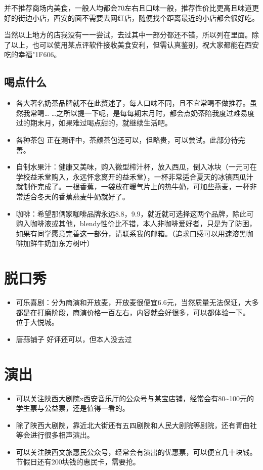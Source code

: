 \documentclass[zihao=-4,fontset=none]{Beautybook-CN}
\begin{document}
并不推荐商场内美食，一般人均都会70左右且口味一般，推荐性价比更高且味道更好的街边小店，西安的面不需要去网红店，随便找个距离最近的小店都会很好吃。

当然以上地方的店我没有一一尝试，去过其中一部分都还不错，所以列在里面。除了以上，也可以使用某点评软件接收美食安利，但需认真鉴别，祝大家都能在西安吃的幸福{\char"1F606}。

\subsection{喝点什么}


\begin{itemize}
\item 各大著名奶茶品牌就不在此赘述了，每人口味不同，且不宜常喝不做推荐。虽然我常喝{\ldots} {\ldots}之所以提一下呢，是每每期末月时，都会点奶茶陪我度过难易度过的期末月，如果难过喝点甜的，就继续生活吧。
\item 各种茶包 正在测评中，茶颜茶包还可以，但略贵，可以尝试。此部分待完善。
\item 自制水果汁：健康又美味，购入微型榨汁杯，放入西瓜，倒入冰块（一元可在学校益禾堂购入，永远怀念离开的益禾堂），一杯非常适合夏天的冰镇西瓜汁就制作完成了。一根香蕉，一袋放在暖气片上的热牛奶，可加些燕麦，一杯非常适合冬天的香蕉燕麦牛奶就好了。
\item 咖啡：希望那俩家咖啡品牌永远8.8，9.9，就近就可选择这两个品牌，除此可购入咖啡液或其他，blendy性价比不错，本人非咖啡爱好者，只是为了防困，如果有同学愿意完善这一部分，请联系我的邮箱。（追求口感可以用速溶黑咖啡加鲜牛奶加东方树叶）
\end{itemize}
\section{脱口秀}
\begin{itemize}
\item 可乐喜剧：分为商演和开放麦，开放麦很便宜6.6元，当然质量无法保证，大多都是在打磨阶段，商演价格一百左右，内容就会好很多，可以都体验一下。 位于大悦城。
\item 唐蒜铺子 好评还可以，但本人没去过
\end{itemize}
\section{演出}
\begin{itemize}
\item 可以关注陕西大剧院x西安音乐厅的公众号与某宝店铺，经常会有80\textasciitilde{}100元的学生票与公益票，还是值得一看的。
\item 除了陕西大剧院，靠近北大街还有五四剧院和人民大剧院等剧院，还有青曲社等会进行很多相声演出。
\item 可以关注陕西文旅惠民公众号，经常会有演出的优惠票，可以便宜几十块钱。节假日还有200块钱的惠民卡，需要抢。
\end{itemize}
\end{document}
